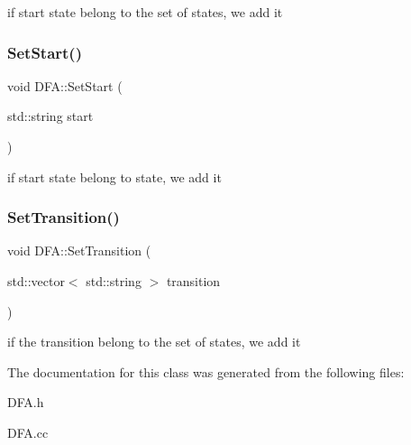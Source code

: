 if start state belong to the set of states, we add it \mbox{\label{classDFA_a075c03019b2cf946ec7a7647821d506c}} 
\subsubsection{\texorpdfstring{Set\+Start()}{SetStart()}}
{\footnotesize\ttfamily void D\+F\+A\+::\+Set\+Start (\begin{DoxyParamCaption}\item[{std\+::string}]{start }\end{DoxyParamCaption})}

if start state belong to state, we add it \mbox{\label{classDFA_ac7986588e884c1fc76700f1059da221f}} 
\subsubsection{\texorpdfstring{Set\+Transition()}{SetTransition()}}
{\footnotesize\ttfamily void D\+F\+A\+::\+Set\+Transition (\begin{DoxyParamCaption}\item[{std\+::vector$<$ std\+::string $>$}]{transition }\end{DoxyParamCaption})}

if the transition belong to the set of states, we add it 

The documentation for this class was generated from the following files\+:\begin{DoxyCompactItemize}
\item 
D\+F\+A.\+h\item 
D\+F\+A.\+cc\end{DoxyCompactItemize}
